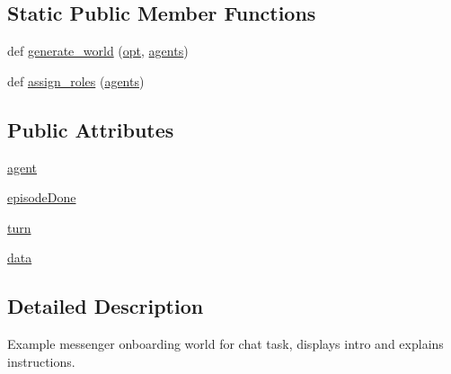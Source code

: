 \subsection*{Static Public Member Functions}
\begin{DoxyCompactItemize}
\item 
def \hyperlink{classparlai_1_1chat__service_1_1tasks_1_1overworld__demo_1_1worlds_1_1MessengerChatOnboardWorld_ad74a9877bae9fd195c574f84fc10f63a}{generate\+\_\+world} (\hyperlink{classparlai_1_1core_1_1worlds_1_1World_a3640d92718acd3e6942a28c1ab3678bd}{opt}, \hyperlink{classparlai_1_1core_1_1worlds_1_1World_a728f75194cc26ea4035047c46cf62608}{agents})
\item 
def \hyperlink{classparlai_1_1chat__service_1_1tasks_1_1overworld__demo_1_1worlds_1_1MessengerChatOnboardWorld_af1108653cf520dd53596e3881e207d2b}{assign\+\_\+roles} (\hyperlink{classparlai_1_1core_1_1worlds_1_1World_a728f75194cc26ea4035047c46cf62608}{agents})
\end{DoxyCompactItemize}
\subsection*{Public Attributes}
\begin{DoxyCompactItemize}
\item 
\hyperlink{classparlai_1_1chat__service_1_1tasks_1_1overworld__demo_1_1worlds_1_1MessengerChatOnboardWorld_a25d6bf779a4bf7dde0d6e88b0fbf86cb}{agent}
\item 
\hyperlink{classparlai_1_1chat__service_1_1tasks_1_1overworld__demo_1_1worlds_1_1MessengerChatOnboardWorld_aa9544d1bc827a7956d84a7ff7fe4425e}{episode\+Done}
\item 
\hyperlink{classparlai_1_1chat__service_1_1tasks_1_1overworld__demo_1_1worlds_1_1MessengerChatOnboardWorld_abc975bd73271e6d8be250354d40ceb96}{turn}
\item 
\hyperlink{classparlai_1_1chat__service_1_1tasks_1_1overworld__demo_1_1worlds_1_1MessengerChatOnboardWorld_a430e883c9ce563600c2d6fd8e9d99b3b}{data}
\end{DoxyCompactItemize}


\subsection{Detailed Description}
\begin{DoxyVerb}Example messenger onboarding world for chat task, displays intro and explains
instructions.
\end{DoxyVerb}
 

